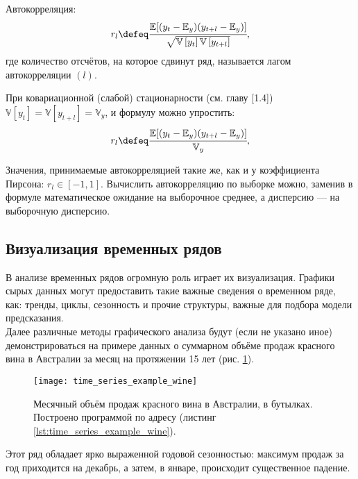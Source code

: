 Автокорреляция:
\begin{equation*}
    r_l \defeq \cfrac{\mathbb{E}[(y_t - \mathbb{E}_y)(y_{t+l} - \mathbb{E}_y)]}{\sqrt{\mathbb{V}\left[y_t\right]\mathbb{V}\left[y_{t+l}\right]}},
\end{equation*}
где количество отсчётов, на которое сдвинут ряд, называется лагом автокорреляции $(l)$.

При ковариационной (слабой) стационарности (см. главу [1.4]) $\mathbb{V}\left[y_t\right] = 
\mathbb{V}\left[y_{t+l}\right] = \mathbb{V}_y$, и формулу можно упростить:
\begin{equation*}
    r_l \defeq \cfrac{\mathbb{E}[(y_t - \mathbb{E}_y)(y_{t+l} - \mathbb{E}_y)]}{\mathbb{V}_y},
\end{equation*}

Значения, принимаемые автокорреляцией такие же, как и у коэффициента 
Пирсона: $r_l \in [-1, 1]$. Вычислить автокорреляцию по выборке можно, заменив в формуле 
математическое ожидание на выборочное среднее, а дисперсию — на выборочную дисперсию.

\subsection{Визуализация временных рядов}

В анализе временных рядов огромную роль играет их визуализация. 
Графики \guillemotleft сырых\guillemotright {} данных могут предоставить такие 
важные сведения о временном ряде, как: тренды, циклы, сезонность и прочие структуры, 
важные для подбора модели предсказания. \\

Далее различные методы графического анализа будут (если не указано иное) 
демонстрироваться 
на примере данных о суммарном объёме продаж красного вина в Австралии за
месяц на протяжении 15 лет (рис. \ref{fig:time_series_wine}).

\begin{figure}[h!]
    \centering
    \texttt{[image: time\_series\_example\_wine]}
    \caption{Месячный объём продаж красного вина в Австралии, в бутылках. 
    Построено программой по адресу (листинг \ref{lst:time_series_example_wine}).}
    \label{fig:time_series_wine}
\end{figure}

Этот ряд обладает ярко выраженной годовой сезонностью: максимум продаж за год 
приходится на декабрь, а затем, в январе, происходит существенное падение.

